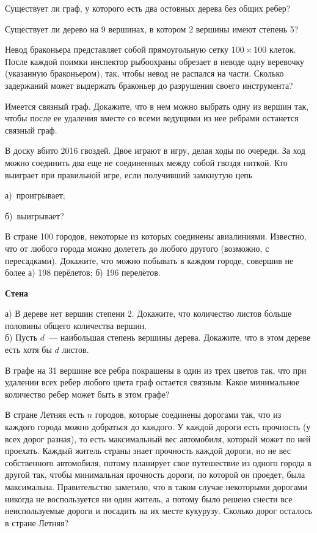 \begin{problems}
\item Существует ли граф, у которого есть два остовных дерева без общих ребер?
\item Существует ли дерево на 9 вершинах, в котором 2 вершины имеют степень 5?
\item Невод браконьера представляет собой прямоугольную сетку $100\times 100$ клеток. После каждой поимки инспектор рыбоохраны обрезает в неводе одну веревочку (указанную браконьером), так, чтобы невод не распался на части. Сколько задержаний может выдержать браконьер до разрушения своего инструмента?
\item Имеется связный граф. Докажите, что в нем можно выбрать одну из вершин так, чтобы после ее
удаления вместе со всеми ведущими из нее ребрами останется связный граф.
\item В доску вбито 2016 гвоздей. Двое играют в игру, делая ходы по очереди. За ход можно соединить два еще не соединенных  между собой гвоздя ниткой. Кто выиграет при правильной игре, если получивший замкнутую цепь
    
    а)~проигрывает;
    
    б)~выигрывает?
\item В стране 100 городов, некоторые из которых соединены авиалиниями. Известно, что от любого города можно долететь до любого другого (возможно, с пересадками). Докажите, что можно побывать в каждом городе, совершив не более  а) 198 перёлетов;  б) 196 перелётов. 
\end{problems}
\begin{center}
\textbf{Стена}\\
\end{center}
\begin{problems}
\item а) В дереве нет вершин степени 2. Докажите, что количество листов
больше половины общего количества вершин.\\
б) Пусть $d$~--- наибольшая степень вершины дерева. Докажите, что в этом дереве есть хотя бы $d$ листов.
\item В графе на 31 вершине все ребра покрашены в один из трех цветов так, что при удалении всех ребер любого цвета граф остается связным. Какое минимальное количество ребер может быть в этом графе?
\item В стране Летняя есть $n$ городов, которые соединены дорогами так, что из каждого города можно добраться до каждого. У каждой дороги есть прочность (у всех дорог разная), то есть максимальный вес автомобиля, который может по ней проехать. Каждый житель страны знает прочность каждой дороги, но не вес собственного автомобиля, потому планирует свое путешествие из одного города в другой так, чтобы минимальная прочность дороги, по которой он проедет, была максимальна. Правительство заметило, что в таком случае некоторыми дорогами никогда не воспользуется ни один житель, а потому было решено снести все неиспользуемые дороги и посадить на их месте кукурузу. Сколько дорог осталось в стране Летняя?
\end{problems}